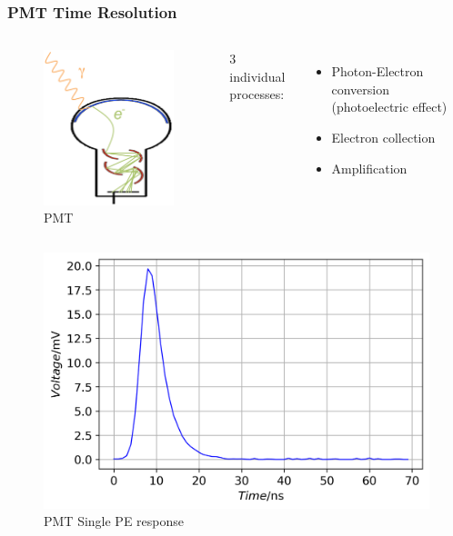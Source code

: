 \documentclass{beamer}
\begin{document}
\begin{frame}
\frametitle{PMT Time Resolution}
\setlength{\abovecaptionskip}{-2mm}
\setlength{\belowcaptionskip}{0mm}
\begin{columns}
\begin{figure}
    \centering
    \caption{PMT}
    \includegraphics[width=0.25\linewidth]{img/PMT.png}
\end{figure}
\begin{center}
    3 individual processes:
\end{center}
\vspace{-4mm}
\begin{itemize}
    \item Photon-Electron conversion (photoelectric effect)
    \item Electron collection
    \item Amplification
\end{itemize}
\end{columns}
\begin{columns}
\begin{figure}
    \centering
    \caption{PMT Single PE response}
    \includegraphics[width=1.0\linewidth]{img/pmtspe.png}
\end{figure}

\end{columns}
\end{frame}
\end{document}
